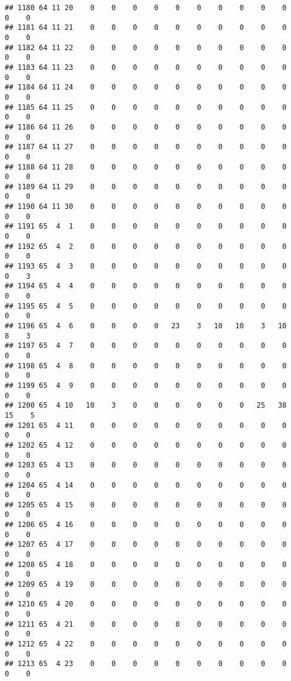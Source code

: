 \documentclass[]{article}
\begin{document}
\begin{verbatim}
## 1180 64 11 20    0    0    0    0    0    0    0    0    0    0    0    0
## 1181 64 11 21    0    0    0    0    0    0    0    0    0    0    0    0
## 1182 64 11 22    0    0    0    0    0    0    0    0    0    0    0    0
## 1183 64 11 23    0    0    0    0    0    0    0    0    0    0    0    0
## 1184 64 11 24    0    0    0    0    0    0    0    0    0    0    0    0
## 1185 64 11 25    0    0    0    0    0    0    0    0    0    0    0    0
## 1186 64 11 26    0    0    0    0    0    0    0    0    0    0    0    0
## 1187 64 11 27    0    0    0    0    0    0    0    0    0    0    0    0
## 1188 64 11 28    0    0    0    0    0    0    0    0    0    0    0    0
## 1189 64 11 29    0    0    0    0    0    0    0    0    0    0    0    0
## 1190 64 11 30    0    0    0    0    0    0    0    0    0    0    0    0
## 1191 65  4  1    0    0    0    0    0    0    0    0    0    0    0    0
## 1192 65  4  2    0    0    0    0    0    0    0    0    0    0    0    0
## 1193 65  4  3    0    0    0    0    0    0    0    0    0    0    0    3
## 1194 65  4  4    0    0    0    0    0    0    0    0    0    0    0    0
## 1195 65  4  5    0    0    0    0    0    0    0    0    0    0    0    0
## 1196 65  4  6    0    0    0    0   23    3   10   10    3   10    8    3
## 1197 65  4  7    0    0    0    0    0    0    0    0    0    0    0    0
## 1198 65  4  8    0    0    0    0    0    0    0    0    0    0    0    0
## 1199 65  4  9    0    0    0    0    0    0    0    0    0    0    0    0
## 1200 65  4 10   10    3    0    0    0    0    0    0   25   38   15    5
## 1201 65  4 11    0    0    0    0    0    0    0    0    0    0    0    0
## 1202 65  4 12    0    0    0    0    0    0    0    0    0    0    0    0
## 1203 65  4 13    0    0    0    0    0    0    0    0    0    0    0    0
## 1204 65  4 14    0    0    0    0    0    0    0    0    0    0    0    0
## 1205 65  4 15    0    0    0    0    0    0    0    0    0    0    0    0
## 1206 65  4 16    0    0    0    0    0    0    0    0    0    0    0    0
## 1207 65  4 17    0    0    0    0    0    0    0    0    0    0    0    0
## 1208 65  4 18    0    0    0    0    0    0    0    0    0    0    0    0
## 1209 65  4 19    0    0    0    0    0    0    0    0    0    0    0    0
## 1210 65  4 20    0    0    0    0    0    0    0    0    0    0    0    0
## 1211 65  4 21    0    0    0    0    0    0    0    0    0    0    0    0
## 1212 65  4 22    0    0    0    0    0    0    0    0    0    0    0    0
## 1213 65  4 23    0    0    0    0    0    0    0    0    0    0    0    0

\end{verbatim}
\end{document}
